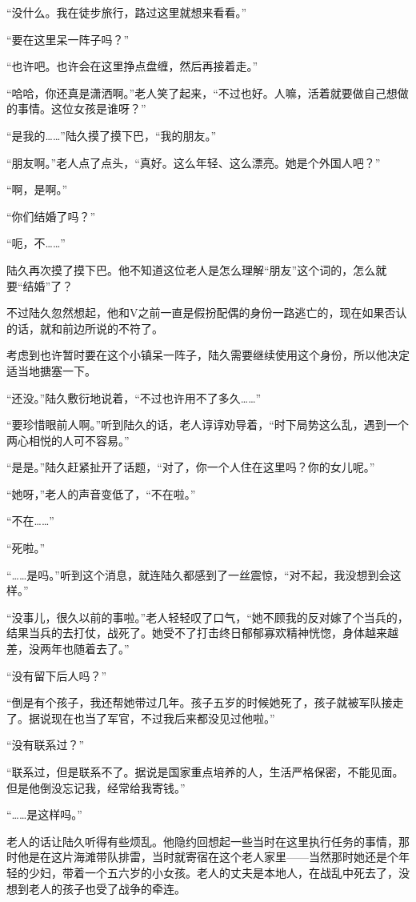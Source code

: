 “没什么。我在徒步旅行，路过这里就想来看看。”

“要在这里呆一阵子吗？”

“也许吧。也许会在这里挣点盘缠，然后再接着走。”

“哈哈，你还真是潇洒啊。”老人笑了起来，“不过也好。人嘛，活着就要做自己想做的事情。这位女孩是谁呀？”

“是我的……”陆久摸了摸下巴，“我的朋友。”

“朋友啊。”老人点了点头，“真好。这么年轻、这么漂亮。她是个外国人吧？”

“啊，是啊。”

“你们结婚了吗？”

“呃，不……”

陆久再次摸了摸下巴。他不知道这位老人是怎么理解“朋友”这个词的，怎么就要“结婚”了？

不过陆久忽然想起，他和V之前一直是假扮配偶的身份一路逃亡的，现在如果否认的话，就和前边所说的不符了。

考虑到也许暂时要在这个小镇呆一阵子，陆久需要继续使用这个身份，所以他决定适当地搪塞一下。

“还没。”陆久敷衍地说着，“不过也许用不了多久……”

“要珍惜眼前人啊。”听到陆久的话，老人谆谆劝导着，“时下局势这么乱，遇到一个两心相悦的人可不容易。”

“是是。”陆久赶紧扯开了话题，“对了，你一个人住在这里吗？你的女儿呢。”

“她呀，”老人的声音变低了，“不在啦。”

“不在……”

“死啦。”

“……是吗。”听到这个消息，就连陆久都感到了一丝震惊，“对不起，我没想到会这样。”

“没事儿，很久以前的事啦。”老人轻轻叹了口气，“她不顾我的反对嫁了个当兵的，结果当兵的去打仗，战死了。她受不了打击终日郁郁寡欢精神恍惚，身体越来越差，没两年也随着去了。”

“没有留下后人吗？”

“倒是有个孩子，我还帮她带过几年。孩子五岁的时候她死了，孩子就被军队接走了。据说现在也当了军官，不过我后来都没见过他啦。”

“没有联系过？”

“联系过，但是联系不了。据说是国家重点培养的人，生活严格保密，不能见面。但是他倒没忘记我，经常给我寄钱。”

“……是这样吗。”

老人的话让陆久听得有些烦乱。他隐约回想起一些当时在这里执行任务的事情，那时他是在这片海滩带队排雷，当时就寄宿在这个老人家里——当然那时她还是个年轻的少妇，带着一个五六岁的小女孩。老人的丈夫是本地人，在战乱中死去了，没想到老人的孩子也受了战争的牵连。

